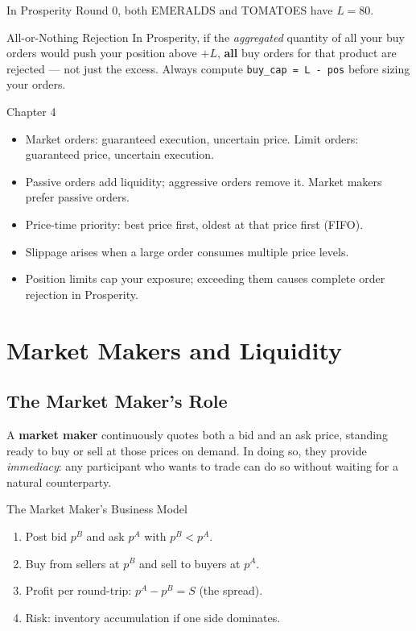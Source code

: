 \documentclass[12pt,a4paper,openany]{report}
\theoremstyle{definition}
\begin{document}
In Prosperity Round 0, both EMERALDS and TOMATOES have $L = 80$.

\begin{warningbox}{All-or-Nothing Rejection}
In Prosperity, if the \emph{aggregated} quantity of all your buy orders would push your position above $+L$, \textbf{all} buy orders for that product are rejected — not just the excess. Always compute \texttt{buy\_cap = L - pos} before sizing your orders.
\end{warningbox}

\begin{takeawaybox}{Chapter 4}
\begin{itemize}
  \item Market orders: guaranteed execution, uncertain price. Limit orders: guaranteed price, uncertain execution.
  \item Passive orders add liquidity; aggressive orders remove it. Market makers prefer passive orders.
  \item Price-time priority: best price first, oldest at that price first (FIFO).
  \item Slippage arises when a large order consumes multiple price levels.
  \item Position limits cap your exposure; exceeding them causes complete order rejection in Prosperity.
\end{itemize}
\end{takeawaybox}


\chapter{Market Makers and Liquidity}

\section{The Market Maker's Role}

A \textbf{market maker} continuously quotes both a bid and an ask price, standing ready to buy or sell at those prices on demand. In doing so, they provide \emph{immediacy}: any participant who wants to trade can do so without waiting for a natural counterparty.

\begin{keyconceptbox}{The Market Maker's Business Model}
\begin{enumerate}[label=\arabic*.]
  \item Post bid $p^B$ and ask $p^A$ with $p^B < p^A$.
  \item Buy from sellers at $p^B$ and sell to buyers at $p^A$.
  \item Profit per round-trip: $p^A - p^B = S$ (the spread).
  \item Risk: inventory accumulation if one side dominates.
\end{enumerate}
\end{keyconceptbox}
\end{document}
